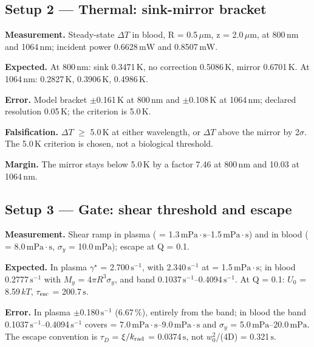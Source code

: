 \documentclass[9pt,a4paper]{article}
\begin{document}
\subsection*{Setup 2 --- Thermal: sink-mirror bracket}
\textbf{Measurement.} Steady-state $\Delta T$ in blood, R = 0.5\,$\mu\mathrm{m}$, z = 2.0\,$\mu\mathrm{m}$, at 800\,$\mathrm{nm}$ and 1064\,$\mathrm{nm}$; incident power 0.6628\,$\mathrm{mW}$ and 0.8507\,$\mathrm{mW}$.

\textbf{Expected.} At 800\,$\mathrm{nm}$: sink 0.3471\,$\mathrm{K}$, no correction 0.5086\,$\mathrm{K}$, mirror 0.6701\,$\mathrm{K}$. At 1064\,$\mathrm{nm}$: 0.2827\,$\mathrm{K}$, 0.3906\,$\mathrm{K}$, 0.4986\,$\mathrm{K}$.

\textbf{Error.} Model bracket $\pm$0.161\,$\mathrm{K}$ at 800\,$\mathrm{nm}$ and $\pm$0.108\,$\mathrm{K}$ at 1064\,$\mathrm{nm}$; declared resolution 0.05\,$\mathrm{K}$; the criterion is 5.0\,$\mathrm{K}$.

\textbf{Falsification.} $\Delta T$ $\ge$ 5.0\,$\mathrm{K}$ at either wavelength, or $\Delta T$ above the mirror by 2$\sigma$. The 5.0\,$\mathrm{K}$ criterion is chosen, not a biological threshold.

\textbf{Margin.} The mirror stays below 5.0\,$\mathrm{K}$ by a factor 7.46 at 800\,$\mathrm{nm}$ and 10.03 at 1064\,$\mathrm{nm}$.

\subsection*{Setup 3 --- Gate: shear threshold and escape}
\textbf{Measurement.} Shear ramp in plasma (\textmu{} = 1.3\,$\mathrm{mPa}\cdot\mathrm{s}$--1.5\,$\mathrm{mPa}\cdot\mathrm{s}$) and in blood (\textmu{} = 8.0\,$\mathrm{mPa}\cdot\mathrm{s}$, $\sigma_y$ = 10.0\,$\mathrm{mPa}$); escape at Q = 0.1.

\textbf{Expected.} In plasma $\gamma^\star$ = 2.700\,$\mathrm{s}^{-1}$, with 2.340\,$\mathrm{s}^{-1}$ at \textmu{} = 1.5\,$\mathrm{mPa}\cdot\mathrm{s}$; in blood 0.2777\,$\mathrm{s}^{-1}$ with $M_y$ = 4$\pi R^3\sigma_y$, and band 0.1037\,$\mathrm{s}^{-1}$--0.4094\,$\mathrm{s}^{-1}$. At Q = 0.1: $U_0$ = 8.59\,$kT$, $\tau_{\rm esc}$ = 200.7\,$\mathrm{s}$.

\textbf{Error.} In plasma $\pm$0.180\,$\mathrm{s}^{-1}$ (6.67\,\%), entirely from the \textmu{} band; in blood the band 0.1037\,$\mathrm{s}^{-1}$--0.4094\,$\mathrm{s}^{-1}$ covers \textmu{} = 7.0\,$\mathrm{mPa}\cdot\mathrm{s}$--9.0\,$\mathrm{mPa}\cdot\mathrm{s}$ and $\sigma_y$ = 5.0\,$\mathrm{mPa}$--20.0\,$\mathrm{mPa}$. The escape convention is $\tau_D$ = $\xi/k_{\rm rad}$ = 0.0374\,$\mathrm{s}$, not $w_0^2$/(4D) = 0.321\,$\mathrm{s}$.
\end{document}
